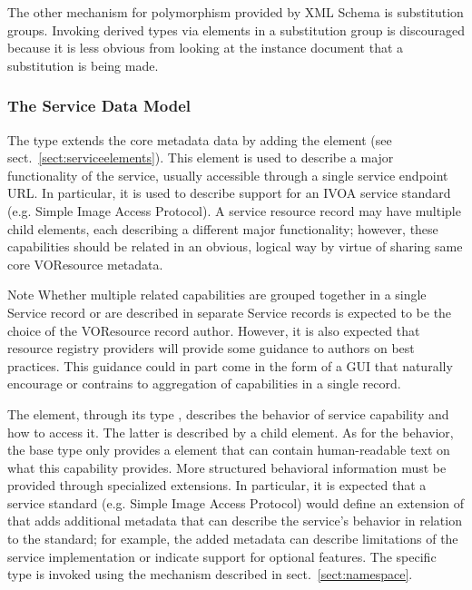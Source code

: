 \documentclass[11pt,a4paper]{ivoa}
\begin{document}
The other mechanism for polymorphism provided by XML Schema is
substitution groups.  Invoking derived  types via
elements in a substitution group is discouraged because it is less
obvious from looking at the instance document that a substitution is
being made.  


\subsubsection{The Service Data Model}
\label{sect:servicemodel}


The  type extends the core 
metadata data by adding the  element (see
sect.~\ref{sect:serviceelements}).  This element is used to describe a major
functionality of the service, usually accessible through a single
service endpoint URL.  In particular, it is used to describe support for
an IVOA service standard (e.g. Simple Image Access Protocol).  A service
resource record may have multiple child  elements,
each describing a different major functionality; however, these
capabilities should be related in an obvious, logical way by virtue of
sharing same core VOResource metadata.  


\begin{admonition}{Note}
Whether multiple related capabilities are grouped together in a
single Service record or are described in separate Service
records is expected to be the choice of the VOResource record
author.  However, it is also expected that resource registry
providers will provide some guidance to authors on best
practices.  This guidance could in part come in the form of a
GUI that naturally encourage or contrains to aggregation of
capabilities in a single record.
\end{admonition}

The  element, through its type ,
describes the behavior of service capability and how to access it.  The
latter is described by a child  element.  As for the
behavior, the base  type only provides a
 element that can contain human-readable text on what
this capability provides.  More structured behavioral information must
be provided through specialized  extensions.  In
particular, it is expected that a service standard (e.g. Simple Image
Access Protocol) would define an extension of  that
adds additional metadata that can describe the service's behavior in
relation to the standard; for example, the added metadata can describe
limitations of the service implementation or indicate support for
optional features.  The specific  type is invoked
using the  mechanism described in
sect.~\ref{sect:namespace}.
\end{document}
